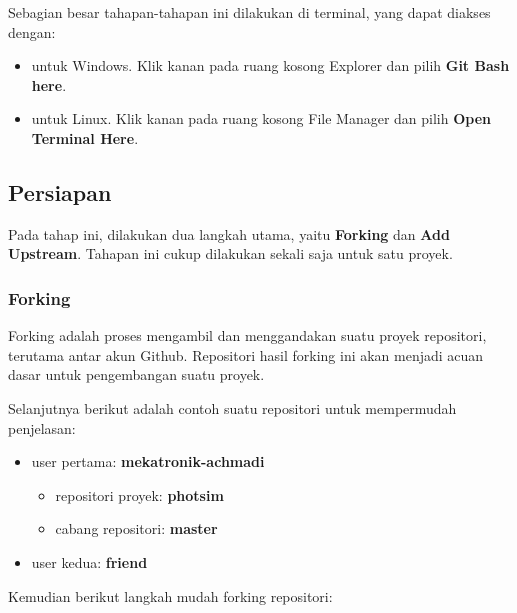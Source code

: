 \documentclass[12pt]{article}
\begin{document}
	Sebagian besar tahapan-tahapan ini dilakukan di terminal, yang dapat diakses dengan:
	\begin{itemize}
		\item untuk Windows. Klik kanan pada ruang kosong Explorer dan pilih \textbf{Git Bash here}.
		\item untuk Linux. Klik kanan pada ruang kosong File Manager dan pilih \textbf{Open Terminal Here}.  
	\end{itemize}

	\subsection{Persiapan}
	
	Pada tahap ini, dilakukan dua langkah utama, yaitu \textbf{Forking} dan \textbf{Add Upstream}.
	Tahapan ini cukup dilakukan sekali saja untuk satu proyek. 
	
	\subsubsection{Forking}
	
	Forking adalah proses mengambil dan menggandakan suatu proyek repositori, terutama antar akun Github.
	Repositori hasil forking ini akan menjadi acuan dasar untuk pengembangan suatu proyek.
	
	Selanjutnya berikut adalah contoh suatu repositori untuk mempermudah penjelasan:
	\begin{itemize}
		\item user pertama: \textbf{mekatronik-achmadi}
		\begin{itemize}
			\item repositori proyek: \textbf{photsim}
			\item cabang repositori: \textbf{master}	 
		\end{itemize}
		\item user kedua: \textbf{friend} 
	\end{itemize}

	Kemudian berikut langkah mudah forking repositori:
	
\end{document}
